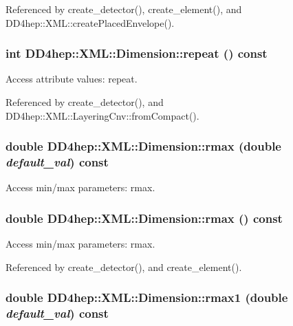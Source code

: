 Referenced by create\_\-detector(), create\_\-element(), and DD4hep::XML::createPlacedEnvelope().\hypertarget{struct_d_d4hep_1_1_x_m_l_1_1_dimension_a991123b4eceede70e79554112a07e1d4}{
\subsubsection[{repeat}]{\setlength{\rightskip}{0pt plus 5cm}int DD4hep::XML::Dimension::repeat () const}}
\label{struct_d_d4hep_1_1_x_m_l_1_1_dimension_a991123b4eceede70e79554112a07e1d4}


Access attribute values: repeat. 

Referenced by create\_\-detector(), and DD4hep::XML::LayeringCnv::fromCompact().\hypertarget{struct_d_d4hep_1_1_x_m_l_1_1_dimension_add4bf2b10c0350f5f509e4d29ac26a43}{
\subsubsection[{rmax}]{\setlength{\rightskip}{0pt plus 5cm}double DD4hep::XML::Dimension::rmax (double {\em default\_\-val}) const}}
\label{struct_d_d4hep_1_1_x_m_l_1_1_dimension_add4bf2b10c0350f5f509e4d29ac26a43}


Access min/max parameters: rmax. \hypertarget{struct_d_d4hep_1_1_x_m_l_1_1_dimension_a5a6284320015a5130fca031a0aefa151}{
\subsubsection[{rmax}]{\setlength{\rightskip}{0pt plus 5cm}double DD4hep::XML::Dimension::rmax () const}}
\label{struct_d_d4hep_1_1_x_m_l_1_1_dimension_a5a6284320015a5130fca031a0aefa151}


Access min/max parameters: rmax. 

Referenced by create\_\-detector(), and create\_\-element().\hypertarget{struct_d_d4hep_1_1_x_m_l_1_1_dimension_a48e1b64f6d48a65460ef65ff298f949a}{
\subsubsection[{rmax1}]{\setlength{\rightskip}{0pt plus 5cm}double DD4hep::XML::Dimension::rmax1 (double {\em default\_\-val}) const}}
\label{struct_d_d4hep_1_1_x_m_l_1_1_dimension_a48e1b64f6d48a65460ef65ff298f949a}


